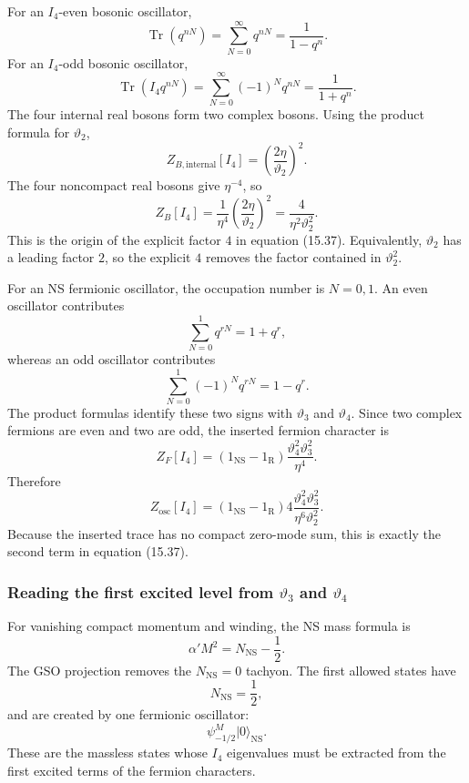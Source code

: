 \documentclass[
  10pt,
  a4paper,
  openany]{book}
\begin{document}
For an \(I_4\)-even bosonic oscillator, \[
\operatorname{Tr}
\left(
q^{nN}
\right)
=
\sum_{N=0}^{\infty}q^{nN}
=
\frac1{1-q^n}.
\] For an \(I_4\)-odd bosonic oscillator, \[
\operatorname{Tr}
\left(
I_4q^{nN}
\right)
=
\sum_{N=0}^{\infty}(-1)^Nq^{nN}
=
\frac1{1+q^n}.
\] The four internal real bosons form two complex bosons. Using the
product formula for \(\vartheta_2\), \[
Z_{B,\mathrm{internal}}[I_4]
=
\left(\frac{2\eta}{\vartheta_2}\right)^2.
\] The four noncompact real bosons give \(\eta^{-4}\), so \[
\boxed{
Z_B[I_4]
=
\frac1{\eta^4}
\left(\frac{2\eta}{\vartheta_2}\right)^2
=
\frac{4}{\eta^2\vartheta_2^2}.
}
\] This is the origin of the explicit factor \(4\) in equation (15.37).
Equivalently, \(\vartheta_2\) has a leading factor \(2\), so the
explicit \(4\) removes the factor contained in \(\vartheta_2^2\).

For an NS fermionic oscillator, the occupation number is \(N=0,1\). An
even oscillator contributes \[
\sum_{N=0}^{1}q^{rN}
=
1+q^r,
\] whereas an odd oscillator contributes \[
\sum_{N=0}^{1}(-1)^Nq^{rN}
=
1-q^r.
\] The product formulas identify these two signs with \(\vartheta_3\)
and \(\vartheta_4\). Since two complex fermions are even and two are
odd, the inserted fermion character is \[
Z_F[I_4]
=
(1_{\mathrm{NS}}-1_{\mathrm R})
\frac{\vartheta_4^2\vartheta_3^2}{\eta^4}.
\] Therefore \[
\boxed{
Z_{\mathrm{osc}}[I_4]
=
(1_{\mathrm{NS}}-1_{\mathrm R})
4\frac{\vartheta_4^2\vartheta_3^2}
{\eta^6\vartheta_2^2}.
}
\] Because the inserted trace has no compact zero-mode sum, this is
exactly the second term in equation (15.37).

\subsubsection{\texorpdfstring{Reading the first excited level from
\(\vartheta_3\) and
\(\vartheta_4\)}{Reading the first excited level from \textbackslash vartheta\_3 and \textbackslash vartheta\_4}}\label{reading-the-first-excited-level-from-vartheta_3-and-vartheta_4}

For vanishing compact momentum and winding, the NS mass formula is \[
\alpha'M^2
=
N_{\mathrm{NS}}-\frac12.
\] The GSO projection removes the \(N_{\mathrm{NS}}=0\) tachyon. The
first allowed states have \[
N_{\mathrm{NS}}=\frac12,
\] and are created by one fermionic oscillator: \[
\psi_{-1/2}^{M}|0\rangle_{\mathrm{NS}}.
\] These are the massless states whose \(I_4\) eigenvalues must be
extracted from the first excited terms of the fermion characters.
\end{document}
